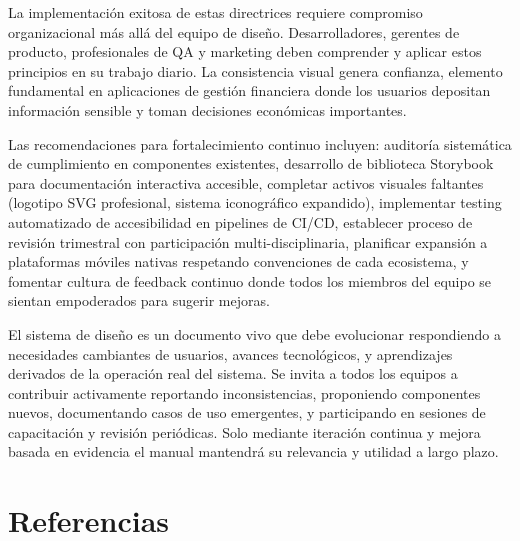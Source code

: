 \documentclass[12pt,a4paper,oneside]{article}
\begin{document}
La implementación exitosa de estas directrices requiere compromiso organizacional más allá del equipo de diseño. Desarrolladores, gerentes de producto, profesionales de QA y marketing deben comprender y aplicar estos principios en su trabajo diario. La consistencia visual genera confianza, elemento fundamental en aplicaciones de gestión financiera donde los usuarios depositan información sensible y toman decisiones económicas importantes.

Las recomendaciones para fortalecimiento continuo incluyen: auditoría sistemática de cumplimiento en componentes existentes, desarrollo de biblioteca Storybook para documentación interactiva accesible, completar activos visuales faltantes (logotipo SVG profesional, sistema iconográfico expandido), implementar testing automatizado de accesibilidad en pipelines de CI/CD, establecer proceso de revisión trimestral con participación multi-disciplinaria, planificar expansión a plataformas móviles nativas respetando convenciones de cada ecosistema, y fomentar cultura de feedback continuo donde todos los miembros del equipo se sientan empoderados para sugerir mejoras.

El sistema de diseño es un documento vivo que debe evolucionar respondiendo a necesidades cambiantes de usuarios, avances tecnológicos, y aprendizajes derivados de la operación real del sistema. Se invita a todos los equipos a contribuir activamente reportando inconsistencias, proponiendo componentes nuevos, documentando casos de uso emergentes, y participando en sesiones de capacitación y revisión periódicas. Solo mediante iteración continua y mejora basada en evidencia el manual mantendrá su relevancia y utilidad a largo plazo.


\section{Referencias}
\end{document}
